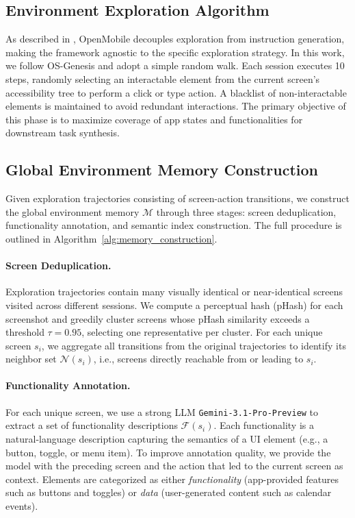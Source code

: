 \documentclass{article} %
\begin{document}
\subsection{Environment Exploration Algorithm}

As described in , OpenMobile decouples exploration from instruction generation, making the framework agnostic to the specific exploration strategy.
In this work, we follow OS-Genesis \citep{sun2025genesis} and adopt a simple random walk. Each session executes 10 steps, randomly selecting an interactable element from the current screen's accessibility tree to perform a click or type action.
A blacklist of non-interactable elements is maintained to avoid redundant interactions.
The primary objective of this phase is to maximize coverage of app states and functionalities for downstream task synthesis.

\subsection{Global Environment Memory Construction}
\label{app:memory_construction}

Given exploration trajectories consisting of screen-action transitions, we construct the global environment memory $\mathcal{M}$ through three stages: screen deduplication, functionality annotation, and semantic index construction. The full procedure is outlined in Algorithm~\ref{alg:memory_construction}.

\paragraph{Screen Deduplication.}
Exploration trajectories contain many visually identical or near-identical screens visited across different sessions. We compute a perceptual hash (pHash) for each screenshot and greedily cluster screens whose pHash similarity exceeds a threshold $\tau = 0.95$, selecting one representative per cluster. For each unique screen $s_i$, we aggregate all transitions from the original trajectories to identify its neighbor set $\mathcal{N}(s_i)$, i.e., screens directly reachable from or leading to $s_i$.

\paragraph{Functionality Annotation.}
For each unique screen, we use a strong LLM \texttt{Gemini-3.1-Pro-Preview} to extract a set of functionality descriptions $\mathcal{F}(s_i)$. Each functionality is a natural-language description capturing the semantics of a UI element (e.g., a button, toggle, or menu item). To improve annotation quality, we provide the model with the preceding screen and the action that led to the current screen as context. Elements are categorized as either \textit{functionality} (app-provided features such as buttons and toggles) or \textit{data} (user-generated content such as calendar events).
\end{document}
